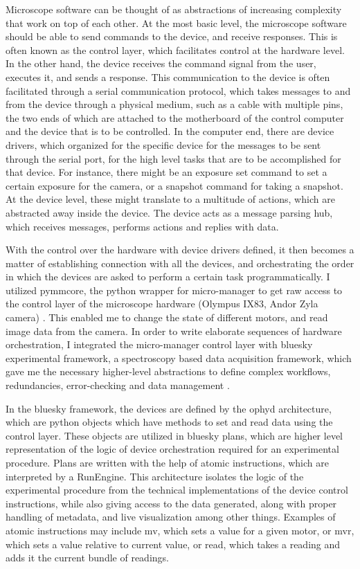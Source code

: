 Microscope software can be thought of as abstractions of increasing complexity that work on top of each other. At the most basic level, the microscope software should be able to send commands to the device, and receive responses. This is often known as the control layer, which facilitates control at the hardware level. In the other hand, the device receives the command signal from the user, executes it, and sends a response. This communication to the device is often facilitated through a serial communication protocol, which takes messages to and from the device through a physical medium, such as a cable with multiple pins, the two ends of which are attached to the motherboard of the control computer and the device that is to be controlled. In the computer end, there are device drivers, which organized for the specific device for the messages to be sent through the serial port, for the high level tasks that are to be accomplished for that device. For instance, there might be an exposure set command to set a certain exposure for the camera, or a snapshot command for taking a snapshot. At the device level, these might translate to a multitude of actions, which are abstracted away inside the device. The device acts as a message parsing hub, which receives messages, performs actions and replies with data.


With the control over the hardware with device drivers defined, it then becomes a matter of establishing connection with all the devices, and orchestrating the order in which the devices are asked to perform a certain task programmatically. I utilized pymmcore, the python wrapper for micro-manager to get raw access to the control layer of the microscope hardware (Olympus IX83, Andor Zyla camera) \cite{edelstein2014advanced}. This enabled me to change the state of different motors, and read image data from the camera. In order to write elaborate sequences of hardware orchestration, I integrated the micro-manager control layer with bluesky experimental framework, a spectroscopy based data acquisition framework, which gave me the necessary higher-level abstractions to define complex workflows, redundancies, error-checking and data management \cite{allan2019bluesky}.


In the bluesky framework, the devices are defined by the ophyd architecture, which are python objects which have methods to set and read data using the control layer. These objects are utilized in bluesky plans, which are higher level representation of the logic of device orchestration required for an experimental procedure. Plans are written with the help of atomic instructions, which are interpreted by a RunEngine. This architecture isolates the logic of the experimental procedure from the technical implementations of the device control instructions, while also giving access to the data generated, along with proper handling of metadata, and live visualization among other things. Examples of atomic instructions may include mv, which sets a value for a given motor, or mvr, which sets a value relative to current value, or read, which takes a reading and adds it the current bundle of readings.

